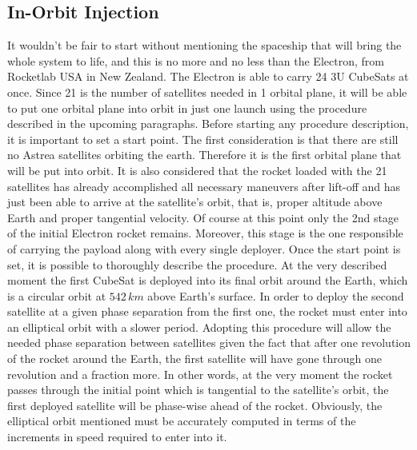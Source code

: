 \subsection{In-Orbit Injection}
It wouldn't be fair to start without mentioning the spaceship that will bring the whole system to life, and this is no more and no less than the Electron, from Rocketlab USA in New Zealand. The Electron is able to carry 24 3U CubeSats at once. Since 21 is the number of satellites needed in 1 orbital plane, it will be able to put one orbital plane into orbit in just one launch using the procedure described in the upcoming paragraphs.
\newline\newline
Before starting any procedure description, it is important to set a start point. The first consideration is that there are still no Astrea satellites orbiting the earth. Therefore it is the first orbital plane that will be put into orbit. It is also considered that the rocket loaded with the 21 satellites has already accomplished all necessary maneuvers after lift-off and has just been able to arrive at the satellite's orbit, that is, proper altitude above Earth and proper tangential velocity. Of course at this point only the 2nd stage of the initial Electron rocket remains. Moreover, this stage is the one responsible of carrying the payload along with every single deployer. Once the start point is set, it is possible to thoroughly describe the procedure.
\newline\newline
At the very described moment the first CubeSat is deployed into its final orbit around the Earth, which is a circular orbit at $542 \,km$ above Earth's surface. In order to deploy the second satellite at a given phase separation from the first one, the rocket must enter into an elliptical orbit with a slower period. Adopting this procedure will allow the needed phase separation between satellites given the fact that after one revolution of the rocket around the Earth, the first satellite will have gone through one revolution and a fraction more. In other words, at the very moment the rocket passes through the initial point which is tangential to the satellite's orbit, the first deployed satellite will be phase-wise ahead of the rocket. Obviously, the elliptical orbit mentioned must be accurately computed in terms of the increments in speed required to enter into it.
\newline\newline

